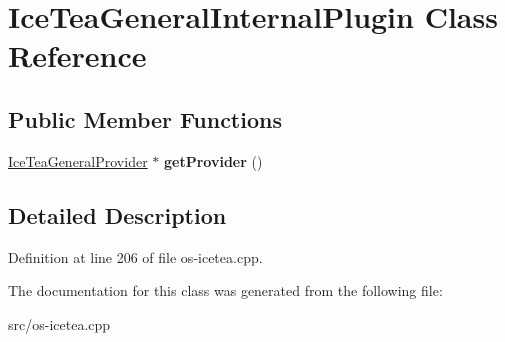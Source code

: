 \hypertarget{class_ice_tea_general_internal_plugin}{}\section{Ice\+Tea\+General\+Internal\+Plugin Class Reference}
\label{class_ice_tea_general_internal_plugin}
\subsection*{Public Member Functions}
\begin{DoxyCompactItemize}
\item 
\hyperlink{class_ice_tea_general_provider}{Ice\+Tea\+General\+Provider} $\ast$ {\bfseries get\+Provider} ()\hypertarget{class_ice_tea_general_internal_plugin_a104728cbe432c7867822898b0c447a3d}{}\label{class_ice_tea_general_internal_plugin_a104728cbe432c7867822898b0c447a3d}

\end{DoxyCompactItemize}


\subsection{Detailed Description}


Definition at line 206 of file os-\/icetea.\+cpp.



The documentation for this class was generated from the following file\+:\begin{DoxyCompactItemize}
\item 
src/os-\/icetea.\+cpp\end{DoxyCompactItemize}
